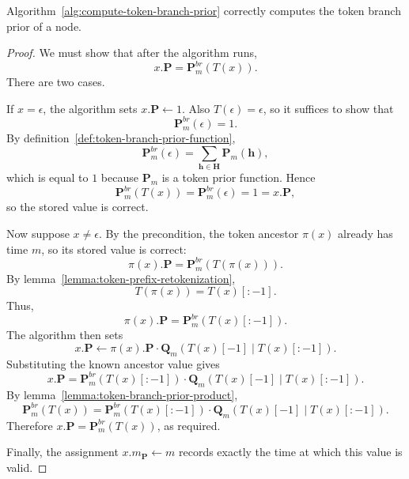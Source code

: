 \begin{theorem}
    Algorithm~\ref{alg:compute-token-branch-prior} correctly computes the token branch prior of a node.
\end{theorem}
\begin{proof}
    We must show that after the algorithm runs,
    \[
    x.\mathbf{P} = \mathbf{P}^{br}_m(T(x)).
    \]
    There are two cases.


    If $x=\epsilon$, the algorithm sets $x.\mathbf{P}\gets 1$.
    Also $T(\epsilon)=\epsilon$, so it suffices to show that
    \[
    \mathbf{P}^{br}_m(\epsilon)=1.
    \]
    By definition~\ref{def:token-branch-prior-function},
    \[
    \mathbf{P}^{br}_m(\epsilon)
    =
    \sum_{\mathbf{h}\in\mathbf{H}} \mathbf{P}_m(\mathbf{h}),
    \]
    which is equal to $1$ because $\mathbf{P}_m$ is a token prior function. Hence
    \[
    \mathbf{P}^{br}_m(T(x))=\mathbf{P}^{br}_m(\epsilon)=1=x.\mathbf{P},
    \]
    so the stored value is correct.

    Now suppose $x\neq \epsilon$.
    By the precondition, the token ancestor $\pi(x)$ already has time $m$,
    so its stored value is correct:
    \[
    \pi(x).\mathbf{P}=\mathbf{P}^{br}_m(T(\pi(x))).
    \]
    By lemma~\ref{lemma:token-prefix-retokenization},
    \[
    T(\pi(x)) = T(x)[:-1].
    \]
    Thus,
    \[
    \pi(x).\mathbf{P}=\mathbf{P}^{br}_m(T(x)[:-1]).
    \]
    The algorithm then sets
    \[
    x.\mathbf{P}
    \gets
    \pi(x).\mathbf{P}\cdot \mathbf{Q}_m(T(x)[-1]\mid T(x)[:-1]).
    \]
    Substituting the known ancestor value gives
    \[
    x.\mathbf{P}
    =
    \mathbf{P}^{br}_m(T(x)[:-1])\cdot \mathbf{Q}_m(T(x)[-1]\mid T(x)[:-1]).
    \]
    By lemma~\ref{lemma:token-branch-prior-product},
    \[
    \mathbf{P}^{br}_m(T(x))
    =
    \mathbf{P}^{br}_m(T(x)[:-1])\cdot \mathbf{Q}_m(T(x)[-1]\mid T(x)[:-1]).
    \]
    Therefore $x.\mathbf{P}=\mathbf{P}^{br}_m(T(x))$, as required.

    Finally, the assignment $x.m_\mathbf{P}\gets m$ records exactly the time at
    which this value is valid.
\end{proof}


